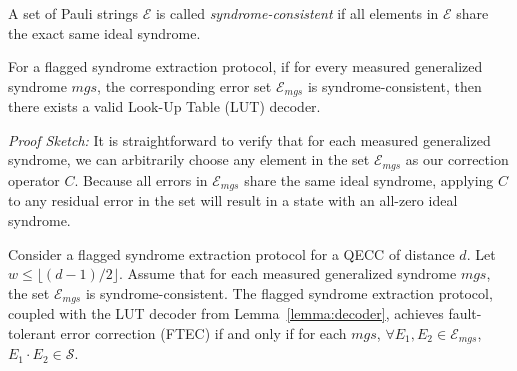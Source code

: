 \documentclass[acmsmallw,review]{acmart}
\begin{document}
\begin{definition}
    A set of Pauli strings $\mathcal{E}$ is called \textit{syndrome-consistent} if all elements in $\mathcal{E}$ share the exact same ideal syndrome. 
\end{definition}

\begin{lemma}
    \label{lemma:decoder}
    For a flagged syndrome extraction protocol, if for every measured generalized syndrome $mgs$, the corresponding error set $\mathcal{E}_{mgs}$ is syndrome-consistent, then there exists a valid Look-Up Table (LUT) decoder.
\end{lemma}
\noindent\textit{Proof Sketch:} It is straightforward to verify that for each measured generalized syndrome, we can arbitrarily choose any element in the set $\mathcal{E}_{mgs}$ as our correction operator $C$. Because all errors in $\mathcal{E}_{mgs}$ share the same ideal syndrome, applying $C$ to any residual error in the set will result in a state with an all-zero ideal syndrome.

\begin{theorem}
\label{thm:mains}
Consider a flagged syndrome extraction protocol for a QECC of distance $d$. Let $w \leq \lfloor (d-1)/2 \rfloor$. Assume that for each measured generalized syndrome $mgs$, the set $\mathcal{E}_{mgs}$ is syndrome-consistent. 
The flagged syndrome extraction protocol, coupled with the LUT decoder from Lemma~\ref{lemma:decoder}, achieves fault-tolerant error correction (FTEC) if and only if for each $mgs$, $\forall E_1, E_2 \in \mathcal{E}_{mgs}$, $E_1 \cdot E_2 \in \mathcal{S}$.
\end{theorem}
\end{document}
